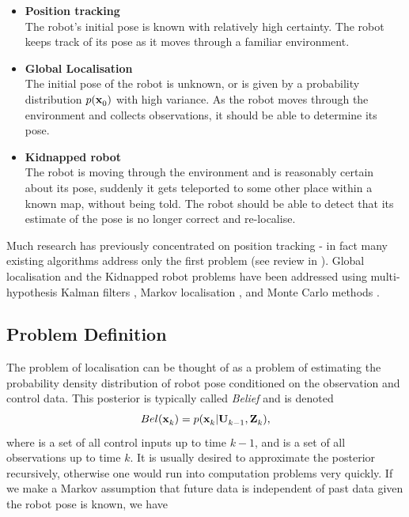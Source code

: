 \begin{itemize}
\item {\bf Position tracking}\\
      The robot's initial pose is known with relatively high
      certainty. The robot keeps track of its pose as it moves through a
      familiar environment.

\item {\bf Global Localisation}\\ 
      The initial pose of the robot is unknown, or is given by a
      probability distribution $p(\x{0}{}{})$ with high variance. As
      the robot moves through the environment and collects
      observations, it should be able to determine its pose.

\item {\bf Kidnapped robot}\\
      The robot is moving through the environment and is reasonably
      certain about its pose, suddenly it gets teleported to some
      other place within a known map, without being told. The robot
      should be able to detect that its estimate of the pose is no
      longer correct and re-localise.
\end{itemize}

Much research has previously concentrated on position tracking - in
fact many existing algorithms address only the first problem (see
review in \cite{Borenstein96}). Global localisation and the Kidnapped
robot problems have been addressed using multi-hypothesis Kalman
filters \cite{JensfeltKristensen01,Cox94}, Markov localisation
\cite{Fox99}, and Monte Carlo methods \cite{Thrun00j}.


\subsection{Problem Definition}

The problem of localisation can be thought of as a problem of
estimating the probability density distribution of robot pose
conditioned on the observation and control data.  This posterior is
typically called {\it Belief} and is denoted
\begin{equation}
  Bel(\x{k}{}{}) = p(\x{k}{}{} | \Uall{k-1}{}, \Zall{k}{}),
\label{eqn:localise_belief}
\end{equation}
where  is a set of all control inputs up to time $k-1$, and
 is a set of all observations up to time $k$. It is usually
desired to approximate the posterior recursively, otherwise one would
run into computation problems very quickly.  If we make a Markov
assumption that future data is independent of past data given the
robot pose is known, we have

